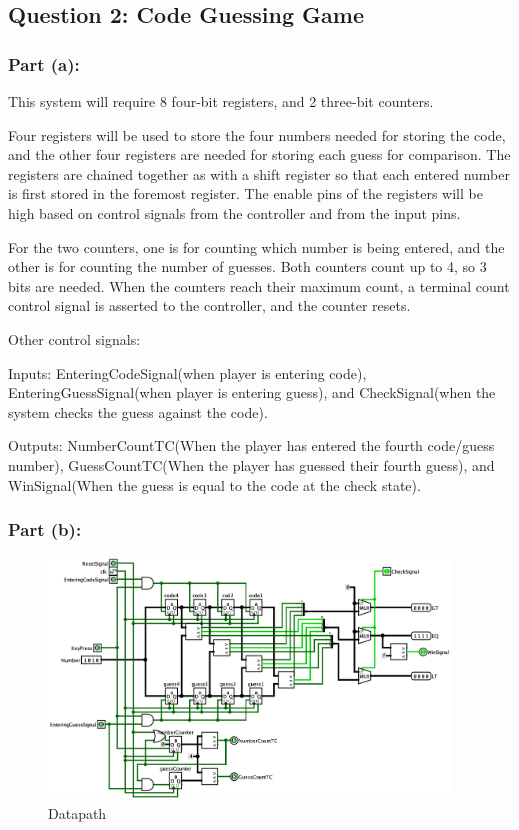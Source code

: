 \documentclass[10pt]{article}
\begin{document}
\subsection*{Question 2: Code Guessing Game}

\subsubsection*{Part (a):}

This system will require 8 four-bit registers, and 2 three-bit counters.

Four registers will be used to store the four numbers needed for storing the code, and the other four registers are needed for storing each guess for comparison.
The registers are chained together as with a shift register so that each entered number is first stored in the foremost register.
The enable pins of the registers will be high based on control signals from the controller and from the input pins.

For the two counters, one is for counting which number is being entered, and the other is for counting the number of guesses.
Both counters count up to 4, so 3 bits are needed.
When the counters reach their maximum count, a terminal count control signal is asserted to the controller, and the counter resets.

Other control signals: 

Inputs: EnteringCodeSignal(when player is entering code), EnteringGuessSignal(when player is entering guess), and CheckSignal(when the system checks the guess against the code). 

Outputs: NumberCountTC(When the player has entered the fourth code/guess number), GuessCountTC(When the player has guessed their fourth guess), and WinSignal(When the guess is equal to the code at the check state).

\subsubsection*{Part (b):}

\begin{figure} [H]
  \center
  \includegraphics[width=0.95\textwidth]{figures/datapath_image.png}
  \caption{Datapath}
\end{figure}
\end{document}
